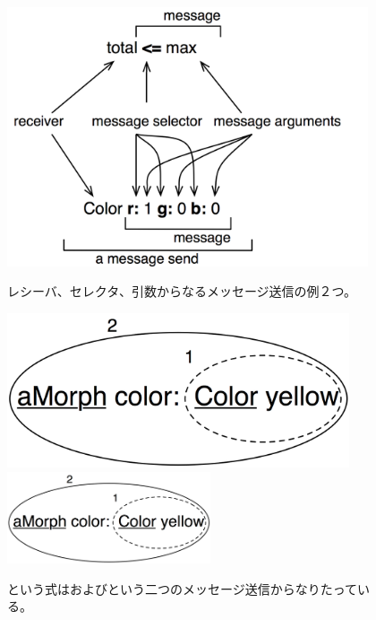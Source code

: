 \documentclass[a4paper,10pt,twoside]{book}
\begin{document}
\begin{figure}[htb]
\begin{minipage}{0.53\textwidth}
	\begin{center}
	\includegraphics[width=0.95\textwidth]{message}
	\caption{レシーバ、セレクタ、引数からなるメッセージ送信の例２つ。}\end{center}
\end{minipage}
\hfill
\begin{minipage}{0.43\textwidth}
	\begin{center}
	\ifluluelse
		{\includegraphics[width=0.9\textwidth]{uKeyUnOne}}
		{\includegraphics[width=6cm]{uKeyUnOne}}
	\caption{という式はおよびという二つのメッセージ送信からなりたっている。}
	\end{center}
\end{minipage}
\end{figure}
\end{document}
